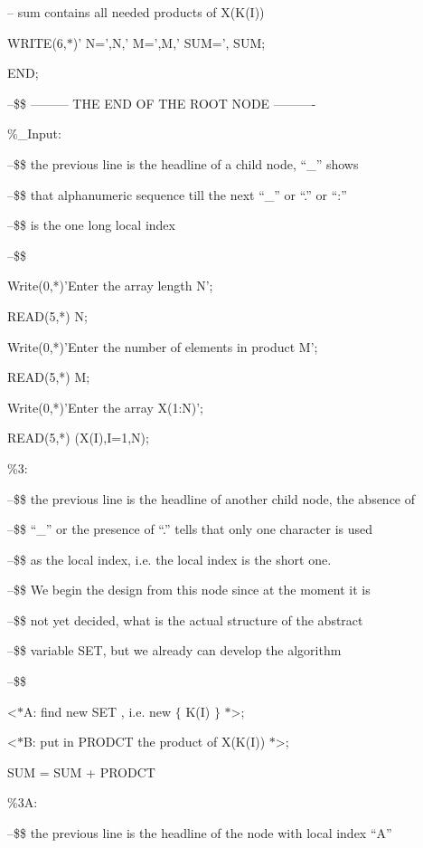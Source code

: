 {{\qquad \qquad \quad -- sum contains all needed products of X(K(I))

\qquad WRITE(6,$*$)' N=',N,' \quad  M=',M,' \quad  SUM=', SUM;

END;

\qquad--\$\$ --------- THE END OF THE ROOT NODE ----------

\%\_Input:

\qquad--\$\$ the previous line is the headline of a child node, ``\_'' shows

\qquad--\$\$ that alphanumeric sequence till the next ``\_'' or ``.''
\qquad \qquad \qquad \qquad or ``:''

\qquad--\$\$ is the one long local index

\qquad--\$\$

\qquad Write(0,*)'Enter the array length N';

\qquad READ(5,*) N;

\qquad Write(0,*)'Enter the number of elements in product M';

\qquad READ(5,*) M;

\qquad Write(0,*)'Enter the array X(1:N)';

\qquad READ(5,*) (X(I),I=1,N);

\%3:

\qquad--\$\$  the previous line is the headline of another child node,
\qquad \qquad \qquad \qquad the absence of

\qquad--\$\$ ``\_'' or the presence of ``.'' tells that only one
\qquad \qquad \qquad \qquad character is used

\qquad--\$\$  as the local index, i.e. the local index is the short one.

\qquad--\$\$  We begin the design from this node since at the moment it
\qquad \qquad \qquad \qquad is

\qquad--\$\$  not yet decided, what is the actual structure of the abstract

\qquad--\$\$  variable SET, but we already can develop the algorithm

\qquad--\$\$

\qquad <$*$A: find new SET , i.e. new $\{$ K(I) $\}$ $*$>;

\qquad <$*$B: put in PRODCT the product of X(K(I)) $*$>;

\qquad SUM = SUM + PRODCT

\%3A:

\qquad--\$\$  the previous line is the headline of the node with
\qquad \qquad \qquad \qquad local index ``A''

}}

